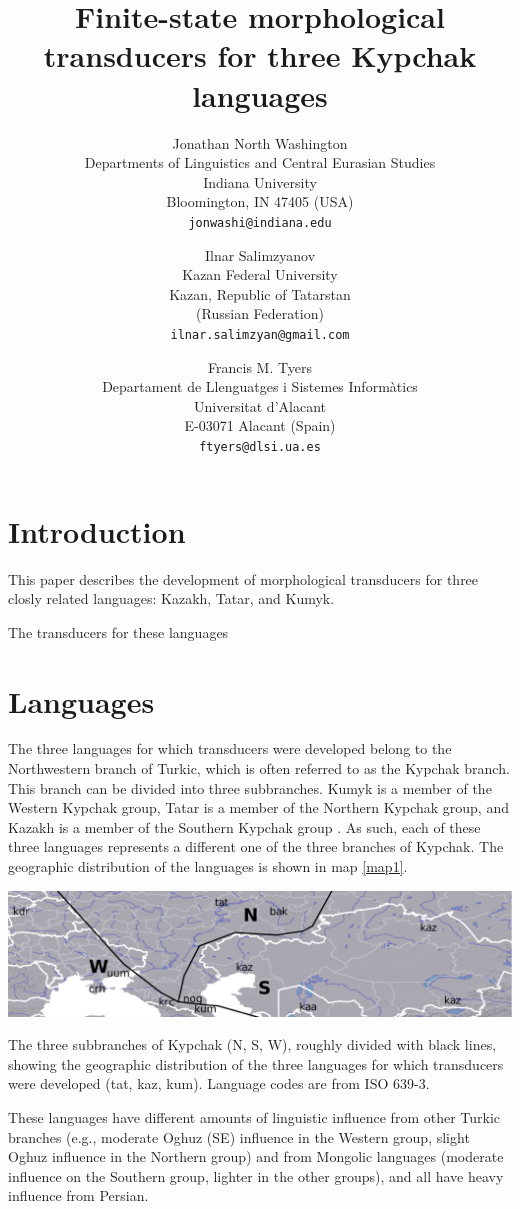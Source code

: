 \documentclass[a4paper,11pt,twocolumn]{article}
\title{Finite-state morphological transducers for three Kypchak languages}
\author{Jonathan North Washington \\
Departments of Linguistics and Central Eurasian Studies\\
Indiana University\\
Bloomington, IN 47405 (USA)\\
\texttt{jonwashi@indiana.edu} \and
Ilnar Salimzyanov  \\
Kazan Federal University \\
Kazan, Republic of Tatarstan\\
(Russian Federation) \\
\texttt{ilnar.salimzyan@gmail.com} \and 
Francis M. Tyers\\
Departament de Llenguatges i Sistemes Informàtics \\  
Universitat d'Alacant\\
E-03071 Alacant (Spain)\\
\texttt{ftyers@dlsi.ua.es} 
}
\begin{document}
\maketitleabstract{}

\section{Introduction}

This paper describes the development of morphological transducers for three closly related languages: Kazakh, Tatar, and Kumyk.

The transducers for these languages 

\section{Languages}

The three languages for which transducers were developed belong to the Northwestern branch of Turkic, which is often referred to as the Kypchak branch.  This branch can be divided into three subbranches.  Kumyk is a member of the Western Kypchak group, Tatar is a member of the Northern Kypchak group, and Kazakh is a member of the Southern Kypchak group \citep[82-83]{histofturkic}.  As such, each of these three languages represents a different one of the three branches of Kypchak.  The geographic distribution of the languages is shown in map \ref{map1}.

\begin{map*}[htbp]
	\includegraphics[width=\textwidth]{map/map}
	\caption{The three subbranches of Kypchak (N, S, W), roughly divided with black lines, showing the geographic distribution of the three languages for which transducers were developed (tat, kaz, kum).  Language codes are from ISO 639-3.}
	\label{map1}
\end{map*}

These languages have different amounts of linguistic influence from other Turkic branches (e.g., moderate Oghuz (SE) influence in the Western group, slight Oghuz influence in the Northern group) and from Mongolic languages (moderate influence on the Southern group, lighter in the other groups), and all have heavy influence from Persian.
\end{document}
